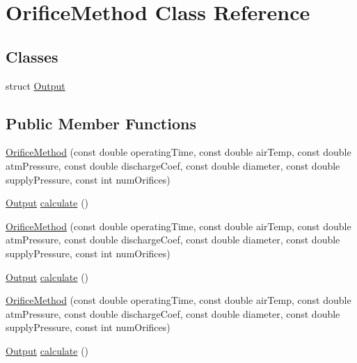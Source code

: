 \hypertarget{class_orifice_method}{}\section{Orifice\+Method Class Reference}
\label{class_orifice_method}
\subsection*{Classes}
\begin{DoxyCompactItemize}
\item 
struct \hyperlink{struct_orifice_method_1_1_output}{Output}
\end{DoxyCompactItemize}
\subsection*{Public Member Functions}
\begin{DoxyCompactItemize}
\item 
\hyperlink{class_orifice_method_aeec8f4a81a56a27d4aef187bdfe2b94a}{Orifice\+Method} (const double operating\+Time, const double air\+Temp, const double atm\+Pressure, const double discharge\+Coef, const double diameter, const double supply\+Pressure, const int num\+Orifices)
\item 
\hyperlink{struct_orifice_method_1_1_output}{Output} \hyperlink{class_orifice_method_af28b39f9d51581926972ac1899734adc}{calculate} ()
\item 
\hyperlink{class_orifice_method_aeec8f4a81a56a27d4aef187bdfe2b94a}{Orifice\+Method} (const double operating\+Time, const double air\+Temp, const double atm\+Pressure, const double discharge\+Coef, const double diameter, const double supply\+Pressure, const int num\+Orifices)
\item 
\hyperlink{struct_orifice_method_1_1_output}{Output} \hyperlink{class_orifice_method_a157ccfd7f2e9ac47e01f3ecc9f049c42}{calculate} ()
\item 
\hyperlink{class_orifice_method_aeec8f4a81a56a27d4aef187bdfe2b94a}{Orifice\+Method} (const double operating\+Time, const double air\+Temp, const double atm\+Pressure, const double discharge\+Coef, const double diameter, const double supply\+Pressure, const int num\+Orifices)
\item 
\hyperlink{struct_orifice_method_1_1_output}{Output} \hyperlink{class_orifice_method_a157ccfd7f2e9ac47e01f3ecc9f049c42}{calculate} ()
\end{DoxyCompactItemize}


